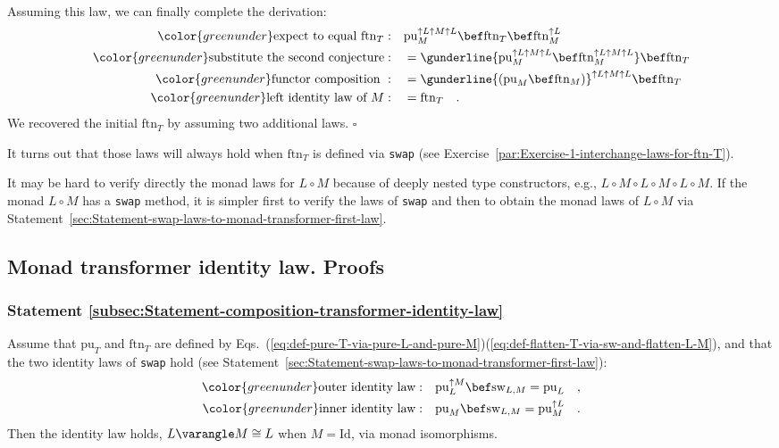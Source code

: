 Assuming this law, we can finally complete the derivation:
\begin{align*}
{\color{greenunder}\text{expect to equal }\text{ftn}_{T}:}\quad & \text{pu}_{M}^{\uparrow L\uparrow M\uparrow L}\bef\text{ftn}_{T}\bef\text{ftn}_{M}^{\uparrow L}\\
{\color{greenunder}\text{substitute the second conjecture}:}\quad & =\gunderline{\text{pu}_{M}^{\uparrow L\uparrow M\uparrow L}\bef\text{ftn}_{M}^{\uparrow L\uparrow M\uparrow L}}\bef\text{ftn}_{T}\\
{\color{greenunder}\text{functor composition }:}\quad & =\gunderline{(\text{pu}_{M}\bef\text{ftn}_{M})}^{\uparrow L\uparrow M\uparrow L}\bef\text{ftn}_{T}\\
{\color{greenunder}\text{left identity law of }M:}\quad & =\text{ftn}_{T}\quad.
\end{align*}
We recovered the initial $\text{ftn}_{T}$ by assuming two additional
laws. $\square$

It turns out that those laws will always hold when $\text{ftn}_{T}$
is defined via \lstinline!swap! (see Exercise~\ref{par:Exercise-1-interchange-laws-for-ftn-T}).

It may be hard to verify directly the monad laws for $L\circ M$ because
of deeply nested type constructors, e.g., $L\circ M\circ L\circ M\circ L\circ M$.
If the monad $L\circ M$ has a \lstinline!swap! method, it is simpler
first to verify the laws of \lstinline!swap! and then to obtain the
monad laws of $L\circ M$ via Statement~\ref{sec:Statement-swap-laws-to-monad-transformer-first-law}.

\subsection{Monad transformer identity law. Proofs}

\subsubsection{Statement \label{subsec:Statement-composition-transformer-identity-law}\ref{subsec:Statement-composition-transformer-identity-law}}

Assume that $\text{pu}_{T}$ and $\text{ftn}_{T}$ are defined by
Eqs.~(\ref{eq:def-pure-T-via-pure-L-and-pure-M})\textendash (\ref{eq:def-flatten-T-via-sw-and-flatten-L-M}),
and that the two identity laws of \lstinline!swap! hold (see Statement~\ref{sec:Statement-swap-laws-to-monad-transformer-first-law}):
\begin{align*}
{\color{greenunder}\text{outer identity law}:}\quad & \text{pu}_{L}^{\uparrow M}\bef\text{sw}_{L,M}=\text{pu}_{L}\quad,\\
{\color{greenunder}\text{inner identity law}:}\quad & \text{pu}_{M}\bef\text{sw}_{L,M}=\text{pu}_{M}^{\uparrow L}\quad.
\end{align*}
Then the identity law holds, $L\varangle M\cong L$ when $M=\text{Id}$,
via monad isomorphisms. 

